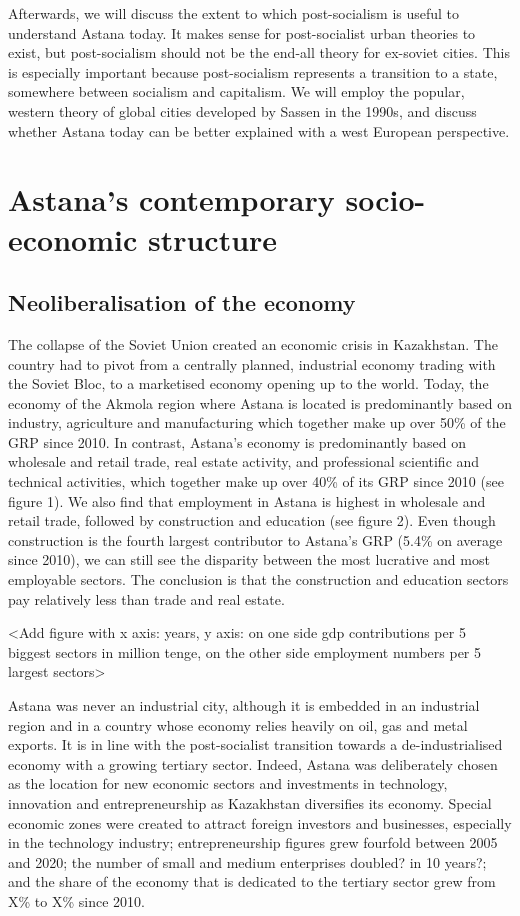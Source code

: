 \documentclass{article}
\begin{document}
Afterwards, we will discuss the extent to which post-socialism is useful to understand Astana today. It makes sense for post-socialist urban theories to exist, but post-socialism should not be the end-all theory for ex-soviet cities. This is especially important because post-socialism represents a transition to a state, somewhere between socialism and capitalism. 
We will employ the popular, western theory of global cities developed by Sassen in the 1990s, and discuss whether Astana today can be better explained with a west European perspective.

\section{Astana's contemporary socio-economic structure}

\subsection{Neoliberalisation of the economy}

The collapse of the Soviet Union created an economic crisis in Kazakhstan. The country had to pivot from a centrally planned, industrial economy trading with the Soviet Bloc, to a marketised economy opening up to the world. Today, the economy of the Akmola region where Astana is located is predominantly based on industry, agriculture and manufacturing which together make up over 50\% of the GRP since 2010. In contrast, Astana's economy is predominantly based on wholesale and retail trade, real estate activity, and professional scientific and technical activities, which together make up over 40\% of its GRP since 2010 (see figure 1).  We also find that employment in Astana is highest in wholesale and retail trade, followed by construction and education (see figure 2). Even though construction is the fourth largest contributor to Astana's GRP (5.4\% on average since 2010), we can still see the disparity between the most lucrative and most employable sectors. The conclusion is that the construction and education sectors pay relatively less than trade and real estate.

<Add figure with x axis: years, y axis: on one side gdp contributions per 5 biggest sectors in million tenge, on the other side employment numbers per 5 largest sectors>

Astana was never an industrial city, although it is embedded in an industrial region and in a country whose economy relies heavily on oil, gas and metal exports. It is in line with the post-socialist transition towards a de-industrialised economy with a growing tertiary sector.
Indeed, Astana was deliberately chosen as the location for new economic sectors and investments in technology, innovation and entrepreneurship as Kazakhstan diversifies its economy. Special economic zones were created to attract foreign investors and businesses, especially in the technology industry; entrepreneurship figures grew fourfold between 2005 and 2020; the number of small and medium enterprises doubled? in 10 years?; and the share of the economy that is dedicated to the tertiary sector grew from X\% to X\% since 2010.
\end{document}
